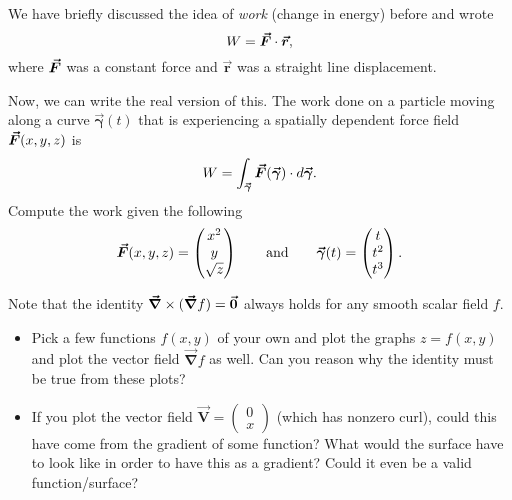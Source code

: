 \documentclass[12pt]{article} %
\newcommand{\vecfieldV}{\boldsymbol{\vec{V}}}
\newcommand{\curvegamma}{\boldsymbol{\vec{\gamma}}}
\newcommand{\grad}{\boldsymbol{\vec{\nabla}}}
\newcommand{\rvec}{\boldsymbol{\vec{r}}}
\begin{document}
\newpage

\begin{problem} 
We have briefly discussed the idea of \emph{work} (change in energy) before and wrote
\[
W = \forcevec \cdot \rvec,
\]
where $\boldsymbol{\vec{F}}$ was a constant force and $\rvec$ was a straight line displacement.

Now, we can write the real version of this. The work done on a particle moving along a curve $\curvegamma(t)$ that is experiencing a spatially dependent force field $\boldsymbol{\vec{F}}(x,y,z)$ is
\[
W = \int_{\curvegamma} \forcevec(\curvegamma) \cdot d\curvegamma.
\]
Compute the work given the following
\[
\forcevec(x,y,z) = \begin{pmatrix} x^2 \\ y \\ \sqrt{z} \end{pmatrix} \qquad \textrm{and} \qquad \curvegamma(t) = \begin{pmatrix} t \\ t^2 \\ t^3 \end{pmatrix}.
\]
\end{problem}
\begin{solution}

\end{solution}

\newpage


\begin{problem}
    Note that the identity $\grad \times (\grad f)=\zerovec$ always holds for any smooth scalar field $f$. 
    \begin{itemize}
        \item Pick a few functions $f(x,y)$ of your own and plot the graphs $z=f(x,y)$ and plot the vector field $\grad f$ as well.  Can you reason why the identity must be true from these plots? 
        \item If you plot the vector field $\vecfieldV = \begin{pmatrix} 0 \\ x \end{pmatrix}$ (which has nonzero curl), could this have come from the gradient of some function? What would the surface have to look like in order to have this as a gradient? Could it even be a valid function/surface?
    \end{itemize}
\end{problem}
\begin{solution}

\end{solution}
\end{document}

